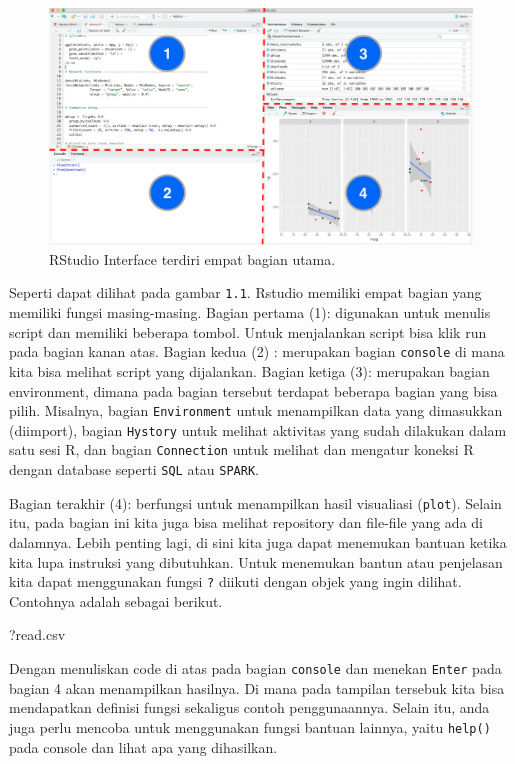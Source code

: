 \documentclass[]{book}
\newenvironment{Shaded}{\begin{snugshade}}{\end{snugshade}}
\newcommand{\NormalTok}[1]{#1}
\begin{document}
\begin{figure}
\includegraphics[width=1\linewidth]{images/RStudio} \caption{RStudio Interface terdiri empat bagian utama.}\label{fig:intro1}
\end{figure}

Seperti dapat dilihat pada gambar \texttt{1.1}. Rstudio memiliki empat
bagian yang memiliki fungsi masing-masing. Bagian pertama (1): digunakan
untuk menulis script dan memiliki beberapa tombol. Untuk menjalankan
script bisa klik run pada bagian kanan atas. Bagian kedua (2) :
merupakan bagian \texttt{console} di mana kita bisa melihat script yang
dijalankan. Bagian ketiga (3): merupakan bagian environment, dimana pada
bagian tersebut terdapat beberapa bagian yang bisa pilih. Misalnya,
bagian \texttt{Environment} untuk menampilkan data yang dimasukkan
(diimport), bagian \texttt{Hystory} untuk melihat aktivitas yang sudah
dilakukan dalam satu sesi R, dan bagian \texttt{Connection} untuk
melihat dan mengatur koneksi R dengan database seperti \texttt{SQL} atau
\texttt{SPARK}.

Bagian terakhir (4): berfungsi untuk menampilkan hasil visualiasi
(\texttt{plot}). Selain itu, pada bagian ini kita juga bisa melihat
repository dan file-file yang ada di dalamnya. Lebih penting lagi, di
sini kita juga dapat menemukan bantuan ketika kita lupa instruksi yang
dibutuhkan. Untuk menemukan bantun atau penjelasan kita dapat
menggunakan fungsi \texttt{?} diikuti dengan objek yang ingin dilihat.
Contohnya adalah sebagai berikut.

\begin{Shaded}
\begin{Highlighting}[]
\NormalTok{?read.csv}
\end{Highlighting}
\end{Shaded}

Dengan menuliskan code di atas pada bagian \texttt{console} dan menekan
\texttt{Enter} pada bagian 4 akan menampilkan hasilnya. Di mana pada
tampilan tersebuk kita bisa mendapatkan definisi fungsi sekaligus contoh
penggunaannya. Selain itu, anda juga perlu mencoba untuk menggunakan
fungsi bantuan lainnya, yaitu \texttt{help()} pada console dan lihat apa
yang dihasilkan.
\end{document}
